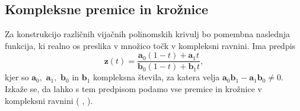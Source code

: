 \documentclass[12pt,a4paper,twoside]{article}
\theoremstyle{definition} %
\theoremstyle{plain} %
\numberwithin{equation}{section}  %
\newcommand{\aV}{\mathbf{a}}
\newcommand{\bV}{\mathbf{b}}
\newcommand{\zV}{\mathbf{z}}
\begin{document}
\subsection{Kompleksne premice in krožnice}

Za konstrukcijo različnih vijačnih polinomskih krivulj bo pomembna naslednja funkcija, ki realno os preslika v množico točk v kompleksni ravnini. Ima predpis
\begin{equation}
	\label{transformacija}
	\zV(t)=\frac{\aV_0(1-t)+\aV_1t}{\bV_0(1-t)+\bV_1t},
\end{equation}
kjer so $\aV_0,$ $\aV_1,$ $\bV_0$ in $\bV_1$ kompleksna števila, za katera velja $\aV_0\bV_1-\aV_1\bV_0\neq 0.$ Izkaže se, da lahko s tem predpisom podamo vse premice in krožnice v kompleksni ravnini ( \cite{schwerdtfeger2020geometry}, \cite{needham1998visual}).
\end{document}
